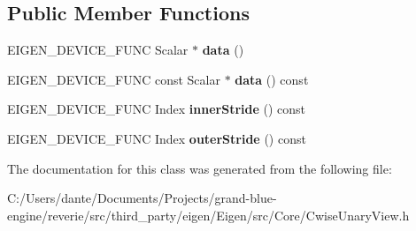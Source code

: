 \subsection*{Public Member Functions}
\begin{DoxyCompactItemize}
\item 
\mbox{\label{class_eigen_1_1_cwise_unary_view_impl_3_01_view_op_00_01_matrix_type_00_01_dense_01_4_a0b7979784d15164b0fd28c04780fcc14}} 
E\+I\+G\+E\+N\+\_\+\+D\+E\+V\+I\+C\+E\+\_\+\+F\+U\+NC Scalar $\ast$ {\bfseries data} ()
\item 
\mbox{\label{class_eigen_1_1_cwise_unary_view_impl_3_01_view_op_00_01_matrix_type_00_01_dense_01_4_aad7a9a099c4570a32457c37ab37d086d}} 
E\+I\+G\+E\+N\+\_\+\+D\+E\+V\+I\+C\+E\+\_\+\+F\+U\+NC const Scalar $\ast$ {\bfseries data} () const
\item 
\mbox{\label{class_eigen_1_1_cwise_unary_view_impl_3_01_view_op_00_01_matrix_type_00_01_dense_01_4_a42a1df4ae2e86aa7424753f610c17859}} 
E\+I\+G\+E\+N\+\_\+\+D\+E\+V\+I\+C\+E\+\_\+\+F\+U\+NC Index {\bfseries inner\+Stride} () const
\item 
\mbox{\label{class_eigen_1_1_cwise_unary_view_impl_3_01_view_op_00_01_matrix_type_00_01_dense_01_4_a21726c36e716d4edac191283a91ea028}} 
E\+I\+G\+E\+N\+\_\+\+D\+E\+V\+I\+C\+E\+\_\+\+F\+U\+NC Index {\bfseries outer\+Stride} () const
\end{DoxyCompactItemize}


The documentation for this class was generated from the following file\+:\begin{DoxyCompactItemize}
\item 
C\+:/\+Users/dante/\+Documents/\+Projects/grand-\/blue-\/engine/reverie/src/third\+\_\+party/eigen/\+Eigen/src/\+Core/Cwise\+Unary\+View.\+h\end{DoxyCompactItemize}
